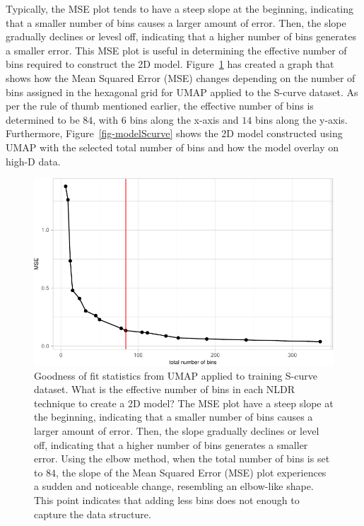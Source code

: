 \documentclass[
  12pt]{article}
\begin{document}
Typically, the MSE plot tends to have a steep slope at the beginning,
indicating that a smaller number of bins causes a larger amount of
error. Then, the slope gradually declines or levesl off, indicating that
a higher number of bins generates a smaller error. This MSE plot is
useful in determining the effective number of bins required to construct
the 2D model. Figure~\ref{fig-diagnosticpltScurve} has created a graph
that shows how the Mean Squared Error (MSE) changes depending on the
number of bins assigned in the hexagonal grid for UMAP applied to the
S-curve dataset. As per the rule of thumb mentioned earlier, the
effective number of bins is determined to be \(84\), with \(6\) bins
along the x-axis and \(14\) bins along the y-axis. Furthermore,
Figure~\ref{fig-modelScurve} shows the 2D model constructed using UMAP
with the selected total number of bins and how the model overlay on
high-D data.

\begin{figure}

{\centering \includegraphics{paper_files/figure-pdf/fig-diagnosticpltScurve-1.pdf}

}

\caption{\label{fig-diagnosticpltScurve}Goodness of fit statistics from
UMAP applied to training S-curve dataset. What is the effective number
of bins in each NLDR technique to create a 2D model? The MSE plot have a
steep slope at the beginning, indicating that a smaller number of bins
causes a larger amount of error. Then, the slope gradually declines or
level off, indicating that a higher number of bins generates a smaller
error. Using the elbow method, when the total number of bins is set to
\(84\), the slope of the Mean Squared Error (MSE) plot experiences a
sudden and noticeable change, resembling an elbow-like shape. This point
indicates that adding less bins does not enough to capture the data
structure.}

\end{figure}
\end{document}
